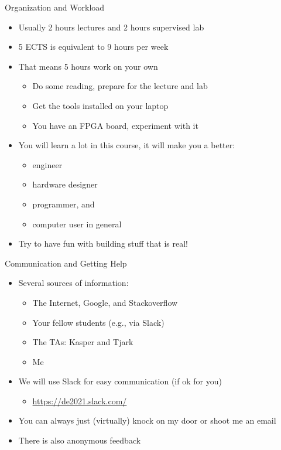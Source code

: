 \begin{frame}[fragile]{Organization and Workload}
\begin{itemize}
\item Usually 2 hours lectures and 2 hours supervised lab
\item 5 ECTS is equivalent to 9 hours per week
\item That means 5 hours work on your own
\begin{itemize}
\item Do some reading, prepare for the lecture and lab
\item Get the tools installed on your laptop
\item You have an FPGA board, experiment with it
\end{itemize}
\item You will learn a lot in this course, it will make you a better:
\begin{itemize}
\item engineer
\item hardware designer
\item programmer, and
\item computer user in general
\end{itemize}
\item Try to have fun with building stuff that is real!
\end{itemize}
\end{frame}

\begin{frame}[fragile]{Communication and Getting Help}
\begin{itemize}
\item Several sources of information:
\begin{itemize}
\item The Internet, Google, and Stackoverflow
\item Your fellow students (e.g., via Slack)
\item The TAs: Kasper and Tjark
\item Me
\end{itemize}
\item We will use Slack for easy communication (if ok for you)
\begin{itemize}
\item \url{https://de2021.slack.com/}
\end{itemize}
\item You can always just (virtually) knock on my door or shoot me an email
\item There is also anonymous feedback
\end{itemize}
\end{frame}


